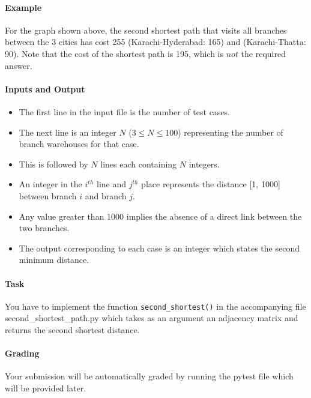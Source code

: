 \documentclass[a4paper]{exam}
\begin{document}
\begin{questions}
	\paragraph{Example} For the graph shown above, the second shortest path that visits all branches between the 3 cities has cost 255 (Karachi-Hyderabad: 165) and (Karachi-Thatta: 90). Note that the cost of the shortest path \cite{clrs} is 195, which is $not$ the required answer.

	\paragraph{Inputs and Output}
	\begin{itemize}
		\item The first line in the input file is the number of test cases.
		\item The next line is an integer $N$ ($3 \leq N \leq 100$) representing the number of branch warehouses for that case.
		\item This is followed by $N$ lines each containing $N$ integers.
		\item An integer in the $i^{th}$ line and $j^{th}$ place represents the distance [1, 1000] between branch $i$ and branch $j$.
		\item Any value greater than 1000 implies the absence of a direct link between the two branches.
		\item The output corresponding to each case is an integer which states the second minimum distance.
	\end{itemize}
	\paragraph{Task}
	You have to implement the function \texttt{second\_shortest()} in the accompanying file second\_shortest\_path.py which takes as an argument an adjacency matrix and returns the second shortest distance.
	\paragraph{Grading}
	Your submission will be automatically graded by running the pytest file which will be provided later.


\end{questions}
\end{document}
